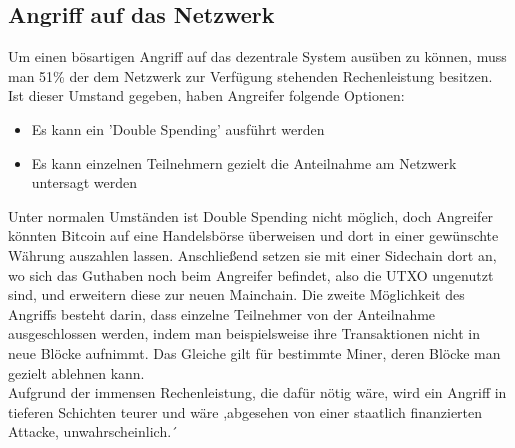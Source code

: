 \subsection{Angriff auf das Netzwerk}
Um einen bösartigen Angriff auf das dezentrale System ausüben zu können, muss man 51\% der dem Netzwerk zur Verfügung stehenden Rechenleistung besitzen. Ist dieser Umstand gegeben, haben Angreifer folgende Optionen:
\begin{itemize}
	\item Es kann ein 'Double Spending' ausführt werden
	\item Es kann einzelnen Teilnehmern gezielt die Anteilnahme am Netzwerk untersagt werden
\end{itemize}
Unter normalen Umständen ist Double Spending nicht möglich, doch Angreifer könnten Bitcoin auf eine Handelsbörse überweisen und dort in einer gewünschte Währung auszahlen lassen. Anschließend setzen sie mit einer Sidechain dort an, wo sich das Guthaben noch beim Angreifer befindet, also die UTXO ungenutzt sind, und erweitern diese zur neuen Mainchain.
Die zweite Möglichkeit des Angriffs besteht darin, dass einzelne Teilnehmer von der Anteilnahme ausgeschlossen werden, indem man beispielsweise ihre Transaktionen nicht in neue Blöcke aufnimmt. Das Gleiche gilt für bestimmte Miner, deren Blöcke man gezielt ablehnen kann.\\
Aufgrund der immensen Rechenleistung, die dafür nötig wäre, wird ein Angriff in tieferen Schichten teurer und wäre ,abgesehen von einer staatlich finanzierten Attacke, unwahrscheinlich.´